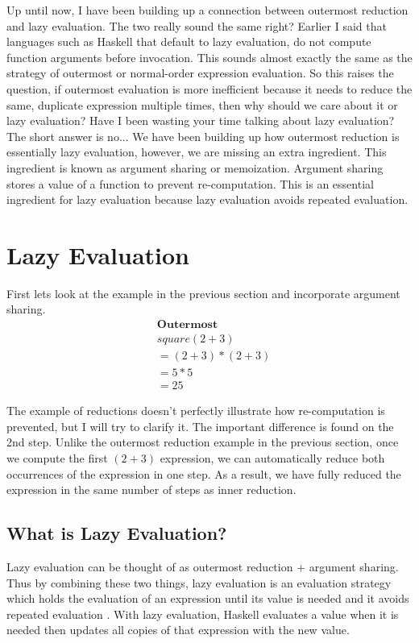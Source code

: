 \documentclass{article}
\begin{document}
\medskip\noindent
Up until now, I have been building up a connection between outermost reduction and lazy evaluation. The two really sound the same right? Earlier I said that languages such as Haskell that default to lazy evaluation, do not compute function arguments before invocation. This sounds almost exactly the same as the strategy of outermost or normal-order expression evaluation. So this raises the question, if outermost evaluation is more inefficient because it needs to reduce the same, duplicate expression multiple times, then why should we care about it or lazy evaluation? Have I been wasting your time talking about lazy evaluation? The short answer is no... We have been building up how outermost reduction is essentially lazy evaluation, however, we are missing an extra ingredient. This ingredient is known as argument sharing or memoization. Argument sharing stores a value of a function to prevent re-computation. This is an essential ingredient for lazy evaluation because lazy evaluation avoids repeated evaluation. 



\section{Lazy Evaluation}

First lets look at the example in the previous section and incorporate argument sharing. \noindent\begin{align*}
&\textbf{Outermost}  \\
&square (2+3)  \\
&=(2+3)*(2+3) \\
&=5 * 5   \\
&=25   
\end{align*}

\medskip\noindent
The example of reductions doesn't perfectly illustrate how re-computation is prevented, but I will try to clarify it. The important difference is found on the 2nd step. Unlike the outermost reduction example in the previous section, once we compute the first $(2+3)$ expression, we can automatically reduce both occurrences of the expression in one step. As a result, we have fully reduced the expression in the same number of steps as inner reduction.

\subsection{What is Lazy Evaluation?}

\medskip\noindent
Lazy evaluation can be thought of as outermost reduction + argument sharing. Thus by combining these two things, lazy evaluation is an evaluation strategy which holds the evaluation of an expression until its value is needed and it avoids repeated evaluation \cite{TP}. With lazy evaluation, Haskell evaluates a value when it is needed then updates all copies of that expression with the new value. 
\end{document}
